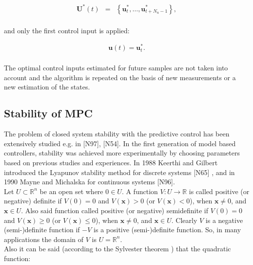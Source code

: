 		\begin{equation}
        \begin{array}{rcl}
				\textbf{U}^*(t)&=&\left\{\textbf{u}^*_t,\dots,\textbf{u}^*_{t+N_u-1}\right\},\\
        \end{array}
        \label{BASICMPC:equ:receiding_optimal_sequence}
    \end{equation}
		
		and only the first control input is applied:
		
		\begin{equation}
        \begin{array}{rcl}
				\textbf{u}(t)=\textbf{u}^*_t.\\
        \end{array}
        \label{BASICMPC:equ:receiding_optimal_first}
    \end{equation}
		
		The optimal control inputs estimated for future samples are not taken into account and the algorithm is
repeated on the basis of new measurements or a new estimation of the states.

\subsection{Stability of MPC}\label{BASICCSR:sec:MPCStability}		

	The problem of closed system stability with the predictive control has been extensively studied e.g. in [N97], [N54]. In the first generation of model based controllers, stability was achieved more experimentally by choosing parameters based on previous studies and experiences. In 1988 Keerthi and Gilbert introduced the Lyapunov stability method for discrete systems [N65] , and in 1990 Mayne and Michalska for continuous systems [N96]. \\
	Let $U\subset\mathbb{R}^n$ be an open set where $0\in U$. A function $V:U\longrightarrow\mathbb{R}$ is called positive (or negative) definite if $V(0)=0$ and $V(\boldsymbol{x})>0$ (or $V(\boldsymbol{x})<0$), when $\boldsymbol{x}\neq0$, and $\boldsymbol{x}\in U$. Also said function called positive (or negative) semidefinite if $V(0)=0$ and $V(\boldsymbol{x})\geq 0$ (or $V(\boldsymbol{x})\leq 0$), when $\boldsymbol{x}\neq 0$, and $\boldsymbol{x}\in U$. Clearly $V$ is a negative (semi-)definite function if $-V$ is a positive (semi-)definite function. So, in many applications the domain of $V$ is $U=\mathbb{R}^n$.\\
	Also it can be said (according to the Sylvester theorem \cite{horn2012matrix}) that the quadratic function:
	
